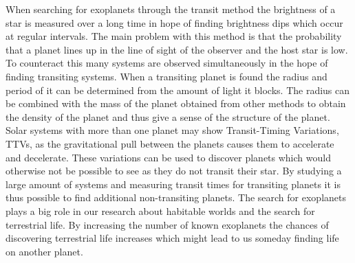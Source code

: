 \documentclass[titlepage]{article}
\begin{document}
	\vspace{0.5cm}\noindent When searching for exoplanets through the transit method the brightness of a star is measured over a long time in hope of finding brightness dips which occur at regular intervals. The main problem with this method is that the probability that a planet lines up in the line of sight of the observer and the host star is low. To counteract this many systems are observed simultaneously in the hope of finding transiting systems. When a transiting planet is found the radius and period of it can be determined from the amount of light it blocks. The radius can be combined with the mass of the planet obtained from other methods to obtain the density of the planet and thus give a sense of the structure of the planet. \\
	
	\vspace{0.5cm}\noindent Solar systems with more than one planet may show Transit-Timing Variations, TTVs, as the gravitational pull between the planets causes them to accelerate and decelerate. These variations can be used to discover planets which would otherwise not be possible to see as they do not transit their star. By studying a large amount of systems and measuring transit times for transiting planets it is thus possible to find additional non-transiting planets. The search for exoplanets plays a big role in our research about habitable worlds and the search for terrestrial life. By increasing the number of known exoplanets the chances of discovering terrestrial life increases which might lead to us someday finding life on another planet. 
	

	
	
\end{document}
